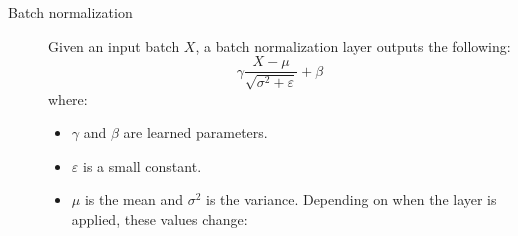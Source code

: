 \begin{description}
    \item[Batch normalization] 
        Given an input batch $X$, a batch normalization layer outputs the following:
        \[ \gamma \frac{X - \mu}{\sqrt{\sigma^2 + \varepsilon}} + \beta \]
        where:
        \begin{itemize}
            \item $\gamma$ and $\beta$ are learned parameters.
            \item $\varepsilon$ is a small constant.
            \item $\mu$ is the mean and $\sigma^2$ is the variance.
                Depending on when the layer is applied, these values change:
        \end{itemize}

\end{description}